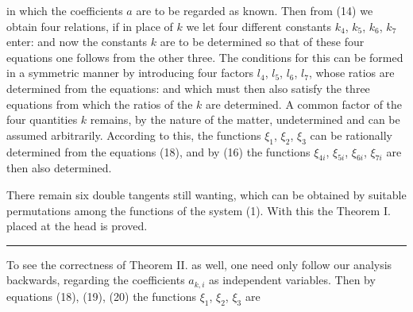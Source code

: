 in which the coefficients $a$ are to be regarded as known. Then from (14) we obtain four relations, if in place of $k$ we let four different constants $k_4$, $k_5$, $k_6$, $k_7$ enter:
and now the constants $k$ are to be determined so that of these four equations one follows from the other three. The conditions for this can be formed in a symmetric manner by introducing four factors $l_4$, $l_5$, $l_6$, $l_7$, whose ratios are determined from the equations:
and which must then also satisfy the three equations
from which the ratios of the $k$ are determined. A common factor of the four quantities $k$ remains, by the nature of the matter, undetermined and can be assumed arbitrarily. According to this, the functions $\xi_1$, $\xi_2$, $\xi_3$ can be rationally determined from the equations (18), and by (16) the functions $\xi_{4i}$, $\xi_{5i}$, $\xi_{6i}$, $\xi_{7i}$ are then also determined.

There remain six double tangents still wanting, which can be obtained by suitable permutations among the functions of the system (1). With this the Theorem I. placed at the head is proved.

\par\noindent\rule{0.3\textwidth}{0.4pt}\par

To see the correctness of Theorem II. as well, one need only follow our analysis backwards, regarding the coefficients $a_{k,i}$ as independent variables. Then by equations (18), (19), (20) the functions $\xi_1$, $\xi_2$, $\xi_3$ are
